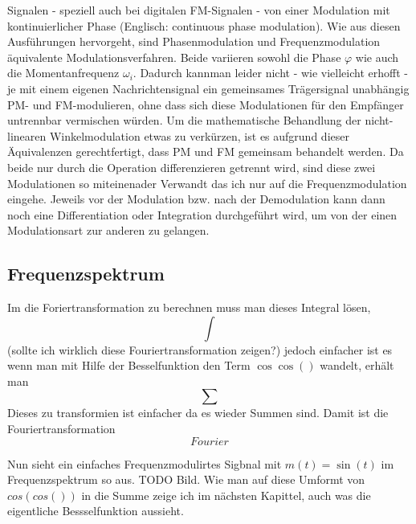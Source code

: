  Signalen - speziell auch bei digitalen FM-Signalen - von einer Modulation mit kontinuierlicher Phase (Englisch: continuous phase modulation).
Wie aus diesen Ausführungen hervorgeht, sind Phasenmodulation und Frequenzmodulation äquivalente Modulationsverfahren.
Beide variieren sowohl die Phase \(\varphi\) wie auch die Momentanfrequenz \(\omega_i.\)
Dadurch kannman leider nicht - wie vielleicht erhofft - je mit einem eigenen Nachrichtensignal ein gemeinsames Trägersignal unabhängig PM- und FM-modulieren,
 ohne dass sich diese Modulationen für den Empfänger untrennbar vermischen würden.
Um die mathematische Behandlung der nicht-linearen Winkelmodulation etwas zu verkürzen, ist es aufgrund dieser Äquivalenzen gerechtfertigt,
dass PM und FM gemeinsam behandelt werden. 
Da beide nur durch die Operation differenzieren getrennt wird, sind diese zwei Modulationen so miteinenader Verwandt das ich nur auf die Frequenzmodulation eingehe.
Jeweils vor der Modulation bzw. nach der Demodulation kann dann noch eine Differentiation oder 
Integration durchgeführt wird, um von der einen Modulationsart zur anderen zu gelangen.
\citeauthor{fm:NAT}

\subsection{Frequenzspektrum}

Im die Foriertransformation zu berechnen muss man dieses Integral lösen,
\[
    \int
\]
(sollte ich wirklich diese Fouriertransformation zeigen?)
jedoch einfacher ist es wenn man mit Hilfe der Besselfunktion den Term \( \cos \cos()\) wandelt,  erhält man
\[
    \sum
\]
Dieses zu transformien ist einfacher da es wieder Summen sind.
Damit ist die Fouriertransformation
\[
    Fourier
    \label{fm:FM:fourie}
\]

Nun sieht ein einfaches Frequenzmodulirtes Sigbnal mit \(m(t) = \sin(t)\) im Frequenzspektrum so aus.
TODO Bild.
Wie man auf diese Umformt von \(cos (cos())\) in die Summe zeige ich im nächsten Kapittel, auch was die eigentliche Bessselfunktion aussieht.

